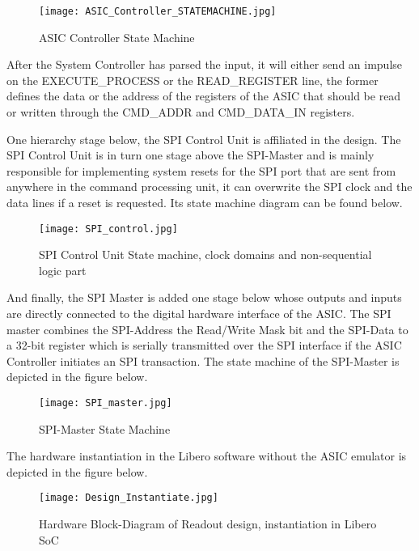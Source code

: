 \begin{figure}[H]
    \centering
    \texttt{[image: ASIC\_Controller\_STATEMACHINE.jpg]}
    \caption[]{ASIC Controller State Machine}
    \label{fig:ASIC_CON_STATE}
\end{figure}

After the System Controller has parsed the input, it will either send an impulse on the EXECUTE\_PROCESS or the READ\_REGISTER line, the former defines the data or the address of the registers of the ASIC that should be read or written through the CMD\_ADDR and CMD\_DATA\_IN registers.

One hierarchy stage below, the SPI Control Unit is affiliated in the design. The SPI Control Unit is in turn one stage above the SPI-Master and is mainly responsible for implementing system resets for the SPI port that are sent from anywhere in the command processing unit, it can overwrite the SPI clock and the data lines if a reset is requested. Its state machine diagram can be found below. 

\begin{figure}[H]
    \centering
    \texttt{[image: SPI\_control.jpg]}
    \caption[]{SPI Control Unit State machine, clock domains and non-sequential logic part}
    \label{fig:ASIC_SPI_STATE}
\end{figure}

And finally, the SPI Master is added one stage below whose outputs and inputs are directly connected to the digital hardware interface of the ASIC. The SPI master combines the SPI-Address the Read/Write Mask bit and the SPI-Data to a 32-bit register which is serially transmitted over the SPI interface if the ASIC Controller initiates an SPI transaction. The state machine of the SPI-Master is depicted in the figure below.

\begin{figure}[H]
    \centering
    \texttt{[image: SPI\_master.jpg]}
    \caption[]{SPI-Master State Machine}
    \label{fig:SPI_master}
\end{figure}

The hardware instantiation in the Libero software without the ASIC emulator is depicted in the figure below.

\begin{figure}[H]
    \centering
    \texttt{[image: Design\_Instantiate.jpg]}
    \caption[]{Hardware Block-Diagram of Readout design, instantiation in Libero SoC}
    \label{fig:Instantiate}
\end{figure}

